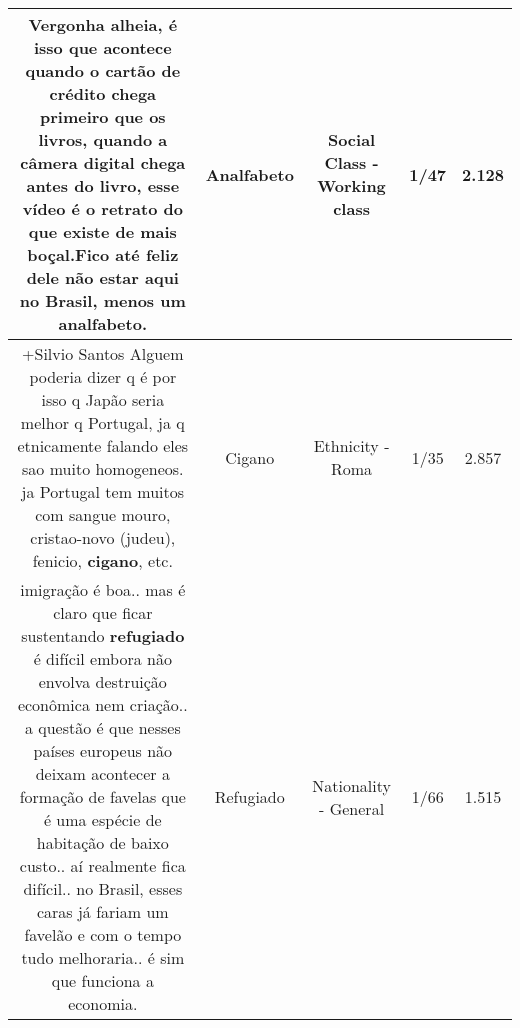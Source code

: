 \documentclass[11pt]{article}
\newlength\mylength
\begin{document}
\begin{center}
\begin{longtable}{|C{.65\mylength}|C{.30\mylength}|C{.12\mylength}|C{.12\mylength}|C{.12\mylength}|}
  \small Vergonha alheia, é isso que acontece quando o cartão de crédito chega primeiro que os livros,  quando a câmera digital chega antes do livro, esse vídeo é o retrato do que existe de mais boçal.Fico até feliz dele não estar aqui no Brasil, menos um \textbf{analfabeto}.\normalsize   & Analfabeto & Social Class - Working class & 1/47 & 2.128 \\  \hline
  \small +Silvio Santos Alguem poderia dizer q é por isso q Japão seria melhor q Portugal, ja q etnicamente falando eles sao muito homogeneos. ja Portugal tem muitos com sangue mouro, cristao-novo (judeu), fenicio, \textbf{cigano}, etc.\normalsize   & Cigano & Ethnicity - Roma & 1/35 & 2.857 \\  \hline
  \small imigração é boa.. mas é claro que ficar sustentando \textbf{refugiado} é difícil embora não envolva destruição econômica nem criação.. a questão é que nesses países europeus não deixam acontecer a formação de favelas que é uma espécie de habitação de baixo custo.. aí realmente fica difícil.. no Brasil, esses caras já fariam um favelão e com o tempo tudo melhoraria.. é sim que funciona a economia.\normalsize   & Refugiado & Nationality - General & 1/66 & 1.515 \\  \hline

\end{longtable}
\end{center}
\end{document}
